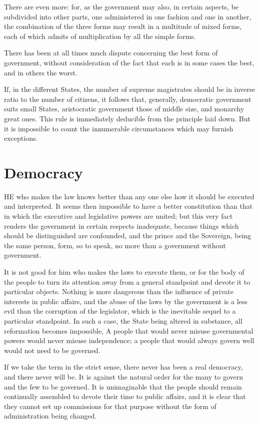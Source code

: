 \documentclass[12pt]{report}
\begin{document}
There are even more: for, as the government may also, in certain aspects, be subdivided into other parts, one administered in one fashion and one in another, the combination of the three forms may result in a multitude of mixed forms, each of which admits of multiplication by all the simple forms.

There has been at all times much dispute concerning the best form of government, without consideration of the fact that each is in some cases the best, and in others the worst.

If, in the different States, the number of supreme magistrates should be in inverse ratio to the number of citizens, it follows that, generally, democratic government suits small States, aristocratic government those of middle size, and monarchy great ones. This rule is immediately deducible from the principle laid down. But it is impossible to count the innumerable circumstances which may furnish exceptions.
\section{Democracy}
HE who makes the law knows better than any one else how it should be executed and interpreted. It seems then impossible to have a better constitution than that in which the executive and legislative powers are united; but this very fact renders the government in certain respects inadequate, because things which should be distinguished are confounded, and the prince and the Sovereign, being the same person, form, so to speak, no more than a government without government.

It is not good for him who makes the laws to execute them, or for the body of the people to turn its attention away from a general standpoint and devote it to particular objects. Nothing is more dangerous than the influence of private interests in public affairs, and the abuse of the laws by the government is a less evil than the corruption of the legislator, which is the inevitable sequel to a particular standpoint. In such a case, the State being altered in substance, all reformation becomes impossible, A people that would never misuse governmental powers would never misuse independence; a people that would always govern well would not need to be governed.

If we take the term in the strict sense, there never has been a real democracy, and there never will be. It is against the natural order for the many to govern and the few to be governed. It is unimaginable that the people should remain continually assembled to devote their time to public affairs, and it is clear that they cannot set up commissions for that purpose without the form of administration being changed.
\end{document}
